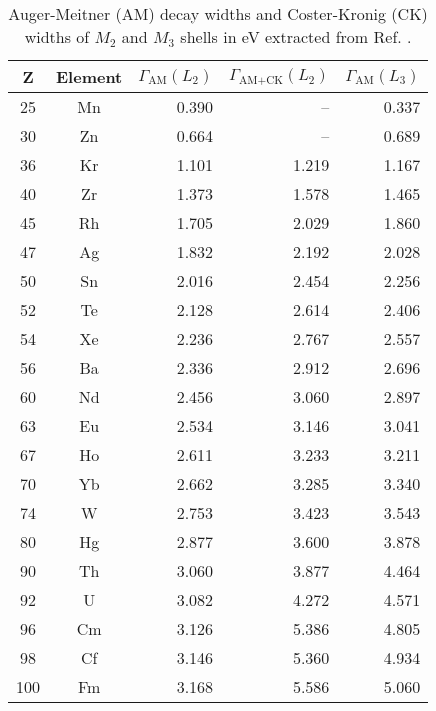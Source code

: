 \begin{table}[h]
 \caption{Auger-Meitner (AM) decay widths and Coster-Kronig (CK) widths
          of $M_2$ and $M_3$ shells in \unit{eV} extracted from
          Ref. \cite{Chen81}.}
 \begin{tabular}{ccrrr}
 \toprule
 Z & Element & $\Gamma_\text{AM}(L_2)$ & $\Gamma_\text{AM+CK}(L_2)$ & $\Gamma_\text{AM}(L_3)$\\
 \midrule
 25 & Mn & 0.390 &  --   & 0.337 \\
 30 & Zn & 0.664 &  --   & 0.689 \\
 36 & Kr & 1.101 & 1.219 & 1.167 \\
 40 & Zr & 1.373 & 1.578 & 1.465 \\
 45 & Rh & 1.705 & 2.029 & 1.860 \\
 47 & Ag & 1.832 & 2.192 & 2.028 \\
 50 & Sn & 2.016 & 2.454 & 2.256 \\
 52 & Te & 2.128 & 2.614 & 2.406 \\
 54 & Xe & 2.236 & 2.767 & 2.557 \\
 56 & Ba & 2.336 & 2.912 & 2.696 \\
 60 & Nd & 2.456 & 3.060 & 2.897 \\
 63 & Eu & 2.534 & 3.146 & 3.041 \\
 67 & Ho & 2.611 & 3.233 & 3.211 \\
 70 & Yb & 2.662 & 3.285 & 3.340 \\
 74 & W  & 2.753 & 3.423 & 3.543 \\
 80 & Hg & 2.877 & 3.600 & 3.878 \\
 90 & Th & 3.060 & 3.877 & 4.464 \\
 92 & U  & 3.082 & 4.272 & 4.571 \\
 96 & Cm & 3.126 & 5.386 & 4.805 \\
 98 & Cf & 3.146 & 5.360 & 4.934 \\
100 & Fm & 3.168 & 5.586 & 5.060 \\
 \bottomrule
 \end{tabular}
 \label{tab:L}
\end{table}
